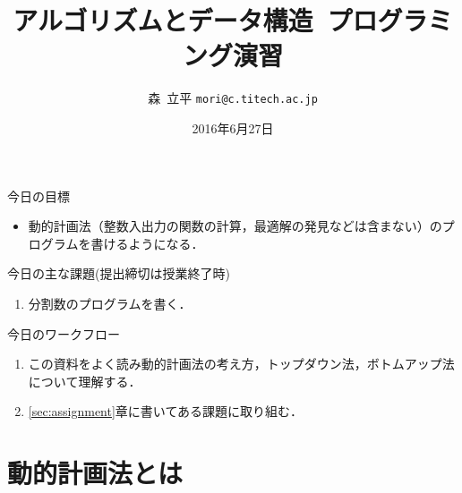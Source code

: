 \documentclass[a4paper,twoside,onecolumn,openany,article]{memoir}
\title{アルゴリズムとデータ構造~プログラミング演習}
\date{2016年6月27日}
\author{森~立平 \texttt{mori@c.titech.ac.jp}}
\theoremstyle{remark}
\begin{document}
\maketitle

\noindent
今日の目標
\begin{itemize}
\item 動的計画法（整数入出力の関数の計算，最適解の発見などは含まない）のプログラムを書けるようになる．
\end{itemize}

\noindent
今日の主な課題(提出締切は授業終了時)
\begin{enumerate}
\item 分割数のプログラムを書く．
\end{enumerate}

\noindent
今日のワークフロー
\begin{enumerate}
\item この資料をよく読み動的計画法の考え方，トップダウン法，ボトムアップ法について理解する．
\item \ref{sec:assignment}章に書いてある課題に取り組む．
\end{enumerate}

\section{動的計画法とは}
\end{document}
